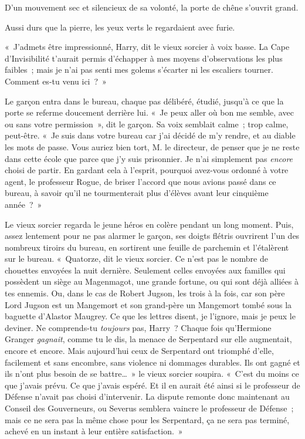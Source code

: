 D'un mouvement sec et silencieux de sa volonté, la porte de chêne s'ouvrit grand.

Aussi durs que la pierre, les yeux verts le regardaient avec furie.

«~J'admets être impressionné, Harry, dit le vieux sorcier à voix basse.
La Cape d'Invisibilité t'aurait permis d'échapper à mes moyens d'observations les plus faibles~; mais je n'ai pas senti mes golems s'écarter ni les escaliers tourner.
Comment es-tu venu ici~?~»

Le garçon entra dans le bureau, chaque pas délibéré, étudié, jusqu'à ce que la porte se referme doucement derrière lui.
«~Je peux aller où bon me semble, avec ou sans votre permission~», dit le garçon.
Sa voix semblait calme~; trop calme, peut-être.
«~Je suis dans votre bureau car j'ai décidé de m'y rendre, et au diable les mots de passe.
Vous auriez bien tort, M. le directeur, de penser que je ne reste dans cette école que parce que j'y suis prisonnier.
Je n'ai simplement pas \emph{encore} choisi de partir.
En gardant cela à l'esprit, pourquoi avez-vous ordonné à votre agent, le professeur Rogue, de briser l'accord que nous avions passé dans ce bureau, à savoir qu'il ne tourmenterait plus d'élèves avant leur cinquième année~?~»

Le vieux sorcier regarda le jeune héros en colère pendant un long moment.
Puis, assez lentement pour ne pas alarmer le garçon, ses doigts flétris ouvrirent l'un des nombreux tiroirs du bureau, en sortirent une feuille de parchemin et l'étalèrent sur le bureau.
«~Quatorze, dit le vieux sorcier.
Ce n'est pas le nombre de chouettes envoyées la nuit dernière.
Seulement celles envoyées aux familles qui possèdent un siège au Magenmagot, une grande fortune, ou qui sont déjà alliées à tes ennemis.
Ou, dans le cas de Robert Jugson, les trois à la fois, car son père Lord Jugson est un Mangemort et son grand-père un Mangemort tombé sous la baguette d'Alastor Maugrey.
Ce que les lettres disent, je l'ignore, mais je peux le deviner.
Ne comprends-tu \emph{toujours} pas, Harry~?
Chaque fois qu'Hermione Granger \emph{gagnait}, comme tu le dis, la menace de Serpentard sur elle augmentait, encore et encore.
Mais aujourd'hui ceux de Serpentard ont triomphé d'elle, facilement et sans encombre, sans violence ni dommages durables.
Ils ont gagné et ils n'ont plus besoin de se battre…~»
le vieux sorcier soupira.
«~C'est du moins ce que j'avais prévu.
Ce que j'avais espéré.
Et il en aurait été ainsi si le professeur de Défense n'avait pas choisi d'intervenir.
La dispute remonte donc maintenant au Conseil des Gouverneurs, ou Severus semblera vaincre le professeur de Défense~; mais ce ne sera pas la même chose pour les Serpentard, ça ne sera pas terminé, achevé en un instant à leur entière satisfaction.~»

